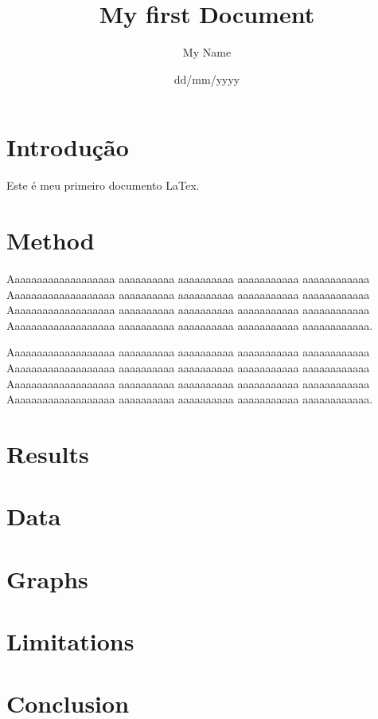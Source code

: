 \documentclass[a4paper,11pt]{article}
\title{My first Document}
\author{My Name}
\date{dd/mm/yyyy}
\begin{document}
	

\maketitle

\section{Introdução}
Este é meu primeiro documento LaTex.

\section{Method}
Aaaaaaaaaaaaaaaaaaa aaaaaaaaaa aaaaaaaaaa aaaaaaaaaaa aaaaaaaaaaaa
Aaaaaaaaaaaaaaaaaaa aaaaaaaaaa aaaaaaaaaa aaaaaaaaaaa aaaaaaaaaaaa
Aaaaaaaaaaaaaaaaaaa aaaaaaaaaa aaaaaaaaaa aaaaaaaaaaa aaaaaaaaaaaa
Aaaaaaaaaaaaaaaaaaa aaaaaaaaaa aaaaaaaaaa aaaaaaaaaaa aaaaaaaaaaaa.

Aaaaaaaaaaaaaaaaaaa aaaaaaaaaa aaaaaaaaaa aaaaaaaaaaa aaaaaaaaaaaa
Aaaaaaaaaaaaaaaaaaa aaaaaaaaaa aaaaaaaaaa aaaaaaaaaaa aaaaaaaaaaaa
Aaaaaaaaaaaaaaaaaaa aaaaaaaaaa aaaaaaaaaa aaaaaaaaaaa aaaaaaaaaaaa
Aaaaaaaaaaaaaaaaaaa aaaaaaaaaa aaaaaaaaaa aaaaaaaaaaa aaaaaaaaaaaa.
\section{Results}
\section{Data}
\section{Graphs}
\section{Limitations}

\section{Conclusion}
\end{document}
